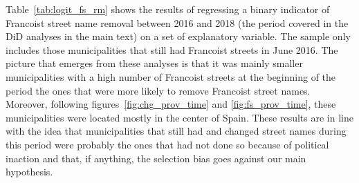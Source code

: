 \documentclass[12pt, titlepage]{article}
\begin{document}
Table~\ref{tab:logit_fs_rm} shows the results of regressing a binary indicator of Francoist street name removal between 2016 and 2018 (the period covered in the DiD analyses in the main text) on a set of explanatory variable.
The sample only includes those municipalities that still had Francoist streets in June 2016.
The picture that emerges from these analyses is that it was mainly smaller municipalities with a high number of Francoist streets at the beginning of the period the ones that were more likely to remove Francoist street names.
Moreover, following figures~\ref{fig:chg_prov_time} and \ref{fig:fs_prov_time}, these municipalities were located mostly in the center of Spain.
These results are in line with the idea that municipalities that still had and changed street names during this period were probably the ones that had not done so because of political inaction and that, if anything, the selection bias goes against our main hypothesis.
\end{document}
